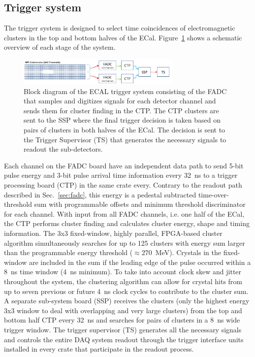\documentclass[final,3p,times,twocolumn]{elsarticle}
\begin{document}
\subsection{Trigger system}
\label{sec:trigger}

The trigger system is designed to select time coincidences of electromagnetic clusters in the 
top and bottom halves of the ECal. Figure~\ref{fig:hps_trigger_cal} shows a schematic overview 
of each stage of the system. 
 \begin{figure}[b]
\begin{center}
{\small
 \includegraphics[width=8cm]{figures/hps_trigger_cal}
\caption{Block diagram of the ECAL trigger system consisting of the FADC that samples and digitizes 
signals for each detector channel and sends them for cluster finding in the CTP. The CTP clusters are 
sent to the SSP where the final trigger decision is taken based on pairs of clusters in both halves of the 
ECal. The decision is sent to the Trigger Supervisor (TS) that generates the necessary signals to readout 
the sub-detectors.}
 \label{fig:hps_trigger_cal}
}
\end{center}
 \end{figure}
Each channel on the FADC board have an 
independent data path to send 5-bit pulse energy and 3-bit pulse arrival time information every 32~ns 
to a 
trigger processing board (CTP) in the same crate every. Contrary to the readout path 
described in Sec.~\ref{sec:fadc}, this energy is a pedestal subtracted time-over-threshold sum with 
programmable offsets and minimum threshold discriminator for each channel. With input from all 
FADC channels, i.e. one half of the ECal, the CTP performs cluster finding and calculates cluster 
energy, shape and timing information. The 3x3 fixed-window, highly parallel, FPGA-based cluster 
algorithm simultaneously searches for up to 125 clusters with energy sum larger than 
the programmable energy threshold ($\approx270$~MeV). Crystals in the 
fixed-window are included in the sum if the leading edge of the pulse occurred within a 8~ns time 
window (4~ns minimum). To take into account clock skew and jitter throughout the system, the
clustering algorithm can allow for crystal hits from up to seven previous or future 4~ns clock cycles to 
contribute to the cluster sum.  A separate sub-system board (SSP) receives the clusters (only the 
highest energy 3x3 window to deal with overlapping and very large clusters) from 
the top and bottom half CTP every 32~ns and searches for pairs of clusters in a 8~ns wide 
trigger window. The trigger supervisor (TS) generates all the necessary signals and controls the 
entire DAQ system readout through the trigger interface units installed in every crate that participate 
in the readout process. 
\end{document}
